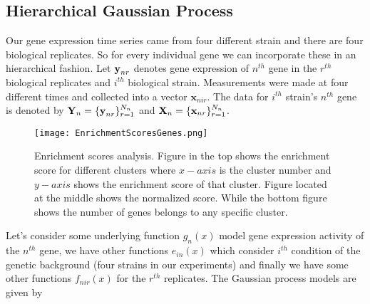 
\subsection{Hierarchical Gaussian Process}
Our gene expression time series came from four different strain and there are four biological 
replicates. So for every individual gene we can incorporate these in an hierarchical fashion.
Let ${\textbf y}_{nr}$ denotes gene expression of $n^{th}$ gene in the $r^{th}$ biological 
replicates and $i^{th}$ biological strain. Measurements were made at four different times 
and collected into a vector $\textbf{x}_{nir}$.
The data for $i^{th}$ strain's $n^{th}$ gene is denoted by 
${\textbf Y}_n = \{{\textbf y}_{nr}\}^{N_n}_{r=1}$ and 
${\textbf X}_n = \{{\textbf x}_{nr}\}^{N_n}_{r=1}$.

\begin{figure}
 \begin{center}
 \texttt{[image: EnrichmentScoresGenes.png]}
  \caption [Enrichment scores analysis for different clusters] 
  {Enrichment scores analysis. Figure in the top shows the enrichment score 
  for different clusters where $x-axis$ is the cluster number and $y-axis$ shows the
  enrichment score of that cluster. Figure located at the middle shows the normalized score.
  While the bottom figure shows the number of genes belongs to any specific cluster.
  \label{fig:EnrichmentScores}}
 \end{center}
\end{figure}


Let's consider some underlying function $g_n\left(x\right)$ model gene expression activity
of the $n^{th}$ gene, we have other functions $e_{in}\left(x\right)$ which consider $i^{th}$ condition
of the genetic background (four strains in our experiments) and finally we have some other
functions $f_{nir}\left(x\right)$ for the $r^{th}$ replicates. The Gaussian process models are
given by

